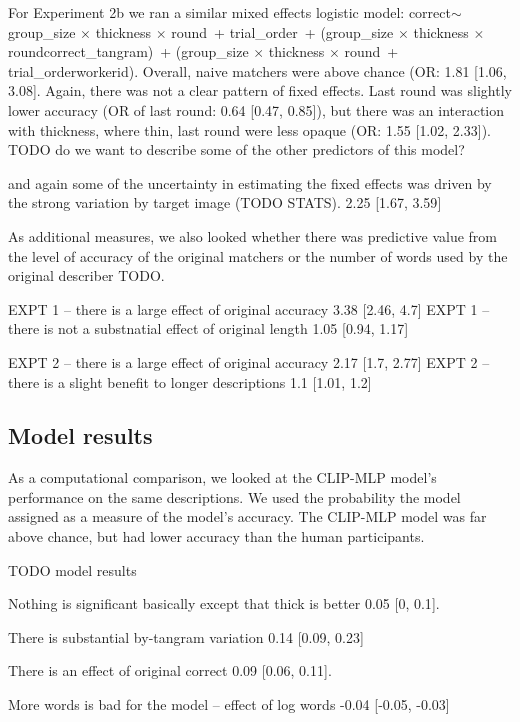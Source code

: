 \documentclass[10pt, letterpaper]{article}
\begin{document}
For Experiment 2b we ran a similar mixed effects logistic model:
correct\(\sim\) group\_size \(\times\) thickness \(\times\) round~+
trial\_order~+ (group\_size \(\times\) thickness \(\times\)
round\textbar correct\_tangram)~+ (group\_size \(\times\) thickness
\(\times\) round~+ trial\_order\textbar workerid). Overall, naive
matchers were above chance (OR: 1.81 {[}1.06, 3.08{]}. Again, there was
not a clear pattern of fixed effects. Last round was slightly lower
accuracy (OR of last round: 0.64 {[}0.47, 0.85{]}), but there was an
interaction with thickness, where thin, last round were less opaque (OR:
1.55 {[}1.02, 2.33{]}). TODO do we want to describe some of the other
predictors of this model?

and again some of the uncertainty in estimating the fixed effects was
driven by the strong variation by target image (TODO STATS). 2.25
{[}1.67, 3.59{]}

As additional measures, we also looked whether there was predictive
value from the level of accuracy of the original matchers or the number
of words used by the original describer TODO.

EXPT 1 -- there is a large effect of original accuracy 3.38 {[}2.46,
4.7{]} EXPT 1 -- there is not a substnatial effect of original length
1.05 {[}0.94, 1.17{]}

EXPT 2 -- there is a large effect of original accuracy 2.17 {[}1.7,
2.77{]} EXPT 2 -- there is a slight benefit to longer descriptions 1.1
{[}1.01, 1.2{]}

\subsection{Model results}\label{model-results}

As a computational comparison, we looked at the CLIP-MLP model's
performance on the same descriptions. We used the probability the model
assigned as a measure of the model's accuracy. The CLIP-MLP model was
far above chance, but had lower accuracy than the human participants.

TODO model results

Nothing is significant basically except that thick is better 0.05 {[}0,
0.1{]}.

There is substantial by-tangram variation 0.14 {[}0.09, 0.23{]}

There is an effect of original correct 0.09 {[}0.06, 0.11{]}.

More words is bad for the model -- effect of log words -0.04 {[}-0.05,
-0.03{]}
\end{document}
